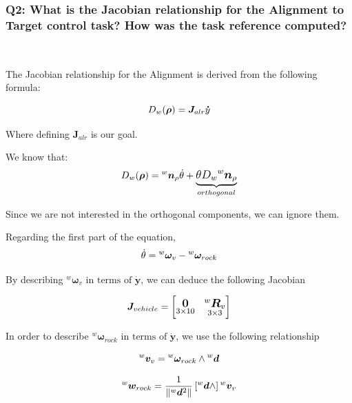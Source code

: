 \documentclass{article}
\begin{document}
\subsubsection{Q2: What is the Jacobian relationship for the Alignment to Target control task? How was the task reference computed?} \

The Jacobian relationship for the Alignment is derived from the following formula:

\begin{equation}
\large
D_{w}(\boldsymbol \rho)=\boldsymbol J_{alr} \boldsymbol \dot{y}
\end{equation}

Where defining $\boldsymbol J_{alr} $ is our goal.

We know that:
\begin{equation}
\large
D_{w}(\boldsymbol \rho)={^w}\boldsymbol n_{\rho} \dot\theta+\underbrace{\theta D_{w} {^w}{\boldsymbol n_{\rho}}}_{orthogonal}
\end{equation}

Since we are not interested in the orthogonal components, we can ignore them.

Regarding the first part of the equation,
\begin{equation}
\large
\dot{\theta}={^w}\boldsymbol{\omega}_{v} - {^w}{\boldsymbol\omega_{{rock}}}
\end{equation}

By describing  ${^w}{\boldsymbol{\omega}}_{v} \text{ in terms of } \boldsymbol{\dot{y}} $, we can deduce the following Jacobian

\begin{equation}
\large
{\boldsymbol J_{vehicle}} = 
    \begin{bmatrix}
     \underset{3\times 10}{\boldsymbol{0}} & \underset{ 3\times 3}{^{w}\boldsymbol{R}_{v}}\\
    \end{bmatrix}
\end{equation}

In order to describe ${^w}\boldsymbol{\omega}_{rock} \text{ in terms of }  \boldsymbol{\dot{y}}$, we use the following relationship

\begin{equation}
\large
{^w}{\boldsymbol v}_{v}={^w}\boldsymbol \omega_{rock} \wedge {^w} \boldsymbol d
\end{equation}

\begin{equation}
\large
{^w}\boldsymbol w_{rock}=\frac{1}{\left\|{^w} \boldsymbol d^{2}\right\|}\left[{^w}{\boldsymbol d} \wedge\right] {{^w}{\boldsymbol v_{v}}}
\end{equation}
\end{document}
